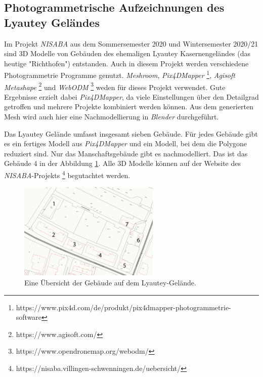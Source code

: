 \subsection{Photogrammetrische Aufzeichnungen des Lyautey Geländes}
Im Projekt \textit{NISABA} \cite{nisaba2021} aus dem Sommersemester 2020 und Wintersemester 2020/21 sind 3D Modelle von Gebäuden des ehemaligen Lyautey Kasernengeländes (das heutige "Richthofen") entstanden. Auch in diesem Projekt werden verschiedene Photogrammetrie Programme genutzt. \textit{Meshroom}, \textit{Pix4DMapper} \footnote{https://www.pix4d.com/de/produkt/pix4dmapper-photogrammetrie-software}, \textit{Agisoft Metashape} \footnote{https://www.agisoft.com/} und \textit{WebODM} \footnote{https://www.opendronemap.org/webodm/} weden für dieses Projekt verwendet. Gute Ergebnisse erzielt dabei \textit{Pix4DMapper}, da viele Einstellungen über den Detailgrad getroffen und mehrere Projekte kombiniert werden können. Aus dem generierten Mesh wird auch hier eine Nachmodellierung in \textit{Blender} durchgeführt.

Das Lyautey Gelände umfasst insgesamt sieben Gebäude. Für jedes Gebäude gibt es ein fertiges Modell aus \textit{Pix4DMapper} und ein Modell, bei dem die Polygone reduziert sind. Nur das Manschaftsgebäude gibt es nachmodelliert. Das ist das Gebäude 4 in der Abbildung \ref{fig:lyautey-map}. Alle 3D Modelle können auf der Website des \textit{NISABA}-Projekts \footnote{https://nisaba.villingen-schwenningen.de/uebersicht/} begutachtet werden. 

\begin{figure}[h]
    \centering
    \includegraphics[width=0.6\textwidth]{img/vorangegangene_Projekte/lyautey_map.jpg}
    \caption{Eine Übersicht der Gebäude auf dem Lyautey-Gelände.}
    \label{fig:lyautey-map}
\end{figure}

